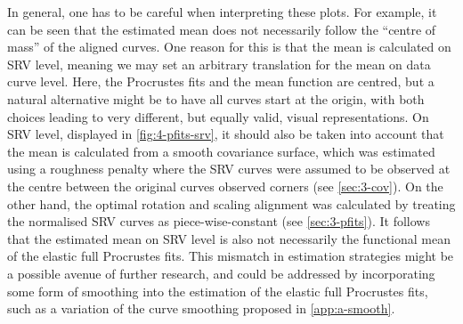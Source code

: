 In general, one has to be careful when interpreting these plots.
For example, it can be seen that the estimated mean does not necessarily follow the \enquote{centre of mass} of the aligned curves. 
One reason for this is that the mean is calculated on SRV level, meaning we may set an arbitrary translation for the mean on data curve level.
Here, the Procrustes fits and the mean function are centred, but a natural alternative might be to have all curves start at the origin, with both choices leading to very different, but equally valid, visual representations.
On SRV level, displayed in \cref{fig:4-pfits-srv}, it should also be taken into account that the mean is calculated from a smooth covariance surface, which was estimated using a roughness penalty where the SRV curves were assumed to be observed at the centre between the original curves observed corners (see \cref{sec:3-cov}).
On the other hand, the optimal rotation and scaling alignment was calculated by treating the normalised SRV curves as piece-wise-constant (see \cref{sec:3-pfits}).
It follows that the estimated mean on SRV level is also not necessarily the functional mean of the elastic full Procrustes fits.
This mismatch in estimation strategies might be a possible avenue of further research, and could be addressed by incorporating some form of smoothing into the estimation of the elastic full Procrustes fits, such as a variation of the curve smoothing proposed in \cref{app:a-smooth}.

